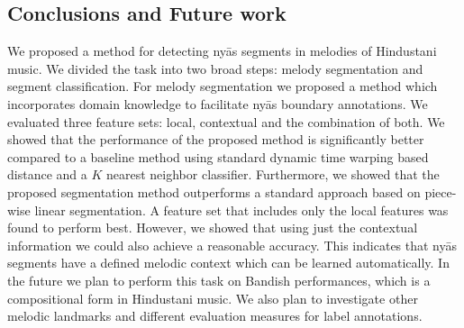\subsection{Conclusions and Future work}
\label{ConclusionAndFutureWork}

We proposed a method for detecting ny\={a}s segments in melodies of Hindustani music. We divided the task into two broad steps: melody segmentation and segment classification. For melody segmentation we proposed a method which incorporates domain knowledge to facilitate ny\={a}s boundary annotations. We evaluated three feature sets: local, contextual and the combination of both. We showed that the performance of the proposed method is significantly better compared to a baseline method using standard dynamic time warping based distance and a $K$ nearest neighbor classifier. Furthermore, we showed that the proposed segmentation method outperforms a standard approach based on piece-wise linear segmentation. A feature set that includes only the local features was found to perform best. However, we showed that using just the contextual information we could also achieve a reasonable accuracy. This indicates that ny\={a}s segments have a defined melodic context which can be learned automatically. In the future we plan to perform this task on Bandish performances, which is a compositional form in Hindustani music. We also plan to investigate other melodic landmarks and different evaluation measures for label annotations.






